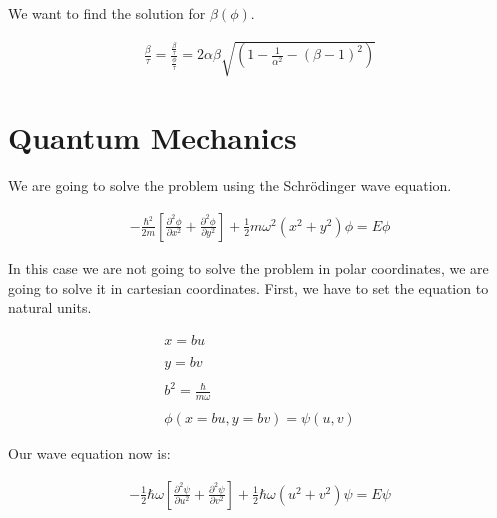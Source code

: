 We want to find the solution for $\beta (\phi)$.

\begin{equation}
  \begin{array}{c}
    \frac{\beta}{\tau} = \frac{\frac{\beta}{\tau}}{\frac{\phi}{\tau}} = 2\alpha\beta\sqrt{\left(1-\frac{1}{\alpha^2}-(\beta-1)^2\right)}
  \end{array}
\end{equation}

\section{Quantum Mechanics}

We are going to solve the problem using the Schrödinger wave equation.

\begin{equation}
  \begin{array}{c}
    -\frac{\hbar^2}{2m} \left[\frac{\partial^2\phi}{\partial x^2} + \frac{\partial^2\phi}{\partial y^2}\right] + \frac{1}{2} m \omega^2 (x^2+y^2)\phi = E \phi
  \end{array}
\end{equation}

In this case we are not going to solve the problem in polar coordinates, we are going to solve it in cartesian coordinates. First, we have to set the equation to natural units.

\begin{equation}
  \begin{array}{c}
    x = b u
    \\

    \\
    y = b v
    \\

    \\
    b^2 = \frac{\hbar}{m\omega}
    \\

    \\
    \phi(x=bu,y=bv) = \psi(u,v)
  \end{array}
\end{equation}

Our wave equation now is:

\begin{equation}
  \begin{array}{c}
    -\frac{1}{2}\hbar\omega \left[\frac{\partial^2\psi}{\partial u^2} + \frac{\partial^2\psi}{\partial v^2}\right] + \frac{1}{2} \hbar \omega (u^2+v^2)\psi = E \psi
  \end{array}
\end{equation}

